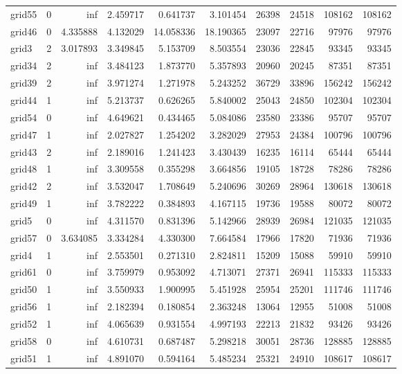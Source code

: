\begin{longtable}{|l|r|r|r|r|r|r|r|r|r|}
grid55 & 0 & inf & 2.459717 & 0.641737 & 3.101454 & 26398 & 24518 & 108162 & 108162 \\
grid46 & 0 & 4.335888 & 4.132029 & 14.058336 & 18.190365 & 23097 & 22716 & 97976 & 97976 \\
grid3 & 2 & 3.017893 & 3.349845 & 5.153709 & 8.503554 & 23036 & 22845 & 93345 & 93345 \\
grid34 & 2 & inf & 3.484123 & 1.873770 & 5.357893 & 20960 & 20245 & 87351 & 87351 \\
grid39 & 2 & inf & 3.971274 & 1.271978 & 5.243252 & 36729 & 33896 & 156242 & 156242 \\
grid44 & 1 & inf & 5.213737 & 0.626265 & 5.840002 & 25043 & 24850 & 102304 & 102304 \\
grid54 & 0 & inf & 4.649621 & 0.434465 & 5.084086 & 23580 & 23386 & 95707 & 95707 \\
grid47 & 1 & inf & 2.027827 & 1.254202 & 3.282029 & 27953 & 24384 & 100796 & 100796 \\
grid43 & 2 & inf & 2.189016 & 1.241423 & 3.430439 & 16235 & 16114 & 65444 & 65444 \\
grid48 & 1 & inf & 3.309558 & 0.355298 & 3.664856 & 19105 & 18728 & 78286 & 78286 \\
grid42 & 2 & inf & 3.532047 & 1.708649 & 5.240696 & 30269 & 28964 & 130618 & 130618 \\
grid49 & 1 & inf & 3.782222 & 0.384893 & 4.167115 & 19736 & 19588 & 80072 & 80072 \\
grid5 & 0 & inf & 4.311570 & 0.831396 & 5.142966 & 28939 & 26984 & 121035 & 121035 \\
grid57 & 0 & 3.634085 & 3.334284 & 4.330300 & 7.664584 & 17966 & 17820 & 71936 & 71936 \\
grid4 & 1 & inf & 2.553501 & 0.271310 & 2.824811 & 15209 & 15088 & 59910 & 59910 \\
grid61 & 0 & inf & 3.759979 & 0.953092 & 4.713071 & 27371 & 26941 & 115333 & 115333 \\
grid50 & 1 & inf & 3.550933 & 1.900995 & 5.451928 & 25954 & 25201 & 111746 & 111746 \\
grid56 & 1 & inf & 2.182394 & 0.180854 & 2.363248 & 13064 & 12955 & 51008 & 51008 \\
grid52 & 1 & inf & 4.065639 & 0.931554 & 4.997193 & 22213 & 21832 & 93426 & 93426 \\
grid58 & 0 & inf & 4.610731 & 0.687487 & 5.298218 & 30051 & 28736 & 128885 & 128885 \\
grid51 & 1 & inf & 4.891070 & 0.594164 & 5.485234 & 25321 & 24910 & 108617 & 108617 \\

\end{longtable}
